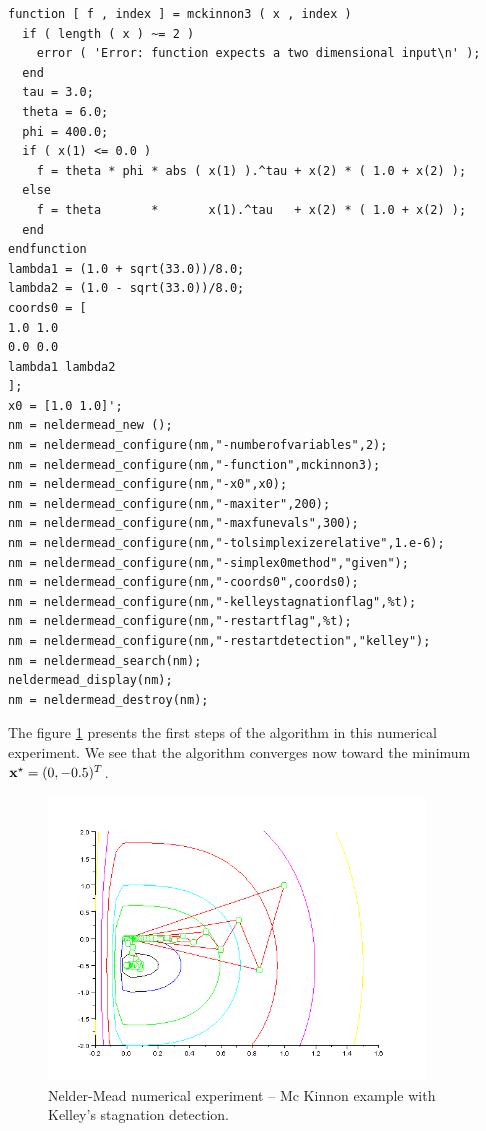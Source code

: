 \lstset{language=scilabscript}
\begin{lstlisting}
function [ f , index ] = mckinnon3 ( x , index )
  if ( length ( x ) ~= 2 )
    error ( 'Error: function expects a two dimensional input\n' );
  end
  tau = 3.0;
  theta = 6.0;
  phi = 400.0;
  if ( x(1) <= 0.0 )
    f = theta * phi * abs ( x(1) ).^tau + x(2) * ( 1.0 + x(2) );
  else
    f = theta       *       x(1).^tau   + x(2) * ( 1.0 + x(2) );
  end
endfunction
lambda1 = (1.0 + sqrt(33.0))/8.0;
lambda2 = (1.0 - sqrt(33.0))/8.0;
coords0 = [
1.0 1.0
0.0 0.0
lambda1 lambda2
];
x0 = [1.0 1.0]';
nm = neldermead_new ();
nm = neldermead_configure(nm,"-numberofvariables",2);
nm = neldermead_configure(nm,"-function",mckinnon3);
nm = neldermead_configure(nm,"-x0",x0);
nm = neldermead_configure(nm,"-maxiter",200);
nm = neldermead_configure(nm,"-maxfunevals",300);
nm = neldermead_configure(nm,"-tolsimplexizerelative",1.e-6);
nm = neldermead_configure(nm,"-simplex0method","given");
nm = neldermead_configure(nm,"-coords0",coords0);
nm = neldermead_configure(nm,"-kelleystagnationflag",%t);
nm = neldermead_configure(nm,"-restartflag",%t);
nm = neldermead_configure(nm,"-restartdetection","kelley");
nm = neldermead_search(nm);
neldermead_display(nm);
nm = neldermead_destroy(nm);
\end{lstlisting}

The figure \ref{fig-nm-numexp-mckinnonkelley} presents the first steps 
of the algorithm in this numerical experiment. We see that the 
algorithm converges now toward the minimum $\mathbf{x}^\star = (0,-0.5)^T$.

\begin{figure}
\begin{center}
\includegraphics[width=10cm]{neldermeadmethod/mckinnonkelley-history-simplex.png}
\end{center}
\caption{Nelder-Mead numerical experiment -- Mc Kinnon example with Kelley's stagnation detection.}
\label{fig-nm-numexp-mckinnonkelley}
\end{figure}


